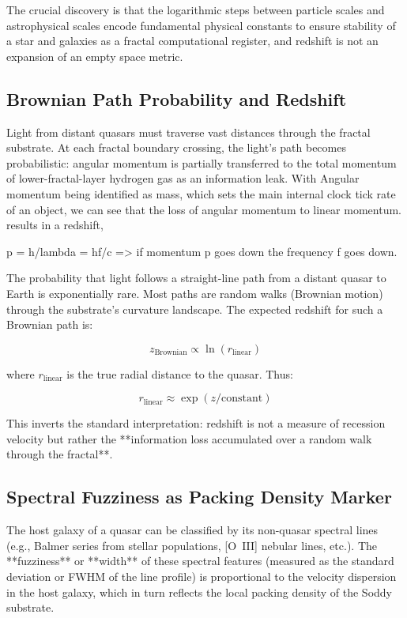\documentclass[11pt,a4paper]{article}
\begin{document}
    The crucial discovery is that the logarithmic steps between particle scales and astrophysical scales encode fundamental physical constants to ensure stability of a star and galaxies as a fractal computational register, and redshift is not an expansion of an empty space metric.

  \subsection{Brownian Path Probability and Redshift}

    Light from distant quasars must traverse vast distances through the fractal substrate. At each fractal boundary crossing, the light's path becomes probabilistic: angular momentum is partially transferred to the total momentum of lower-fractal-layer hydrogen gas as an information leak. With Angular momentum being identified as mass, which sets the main internal clock tick rate of an object, we can see that the loss of angular momentum to linear momentum. results in a redshift,

    p = h/lambda = hf/c => if momentum p goes down the frequency f goes down.  

    The probability that light follows a straight-line path from a distant quasar to Earth is exponentially rare. Most paths are random walks (Brownian motion) through the substrate's curvature landscape. The expected redshift for such a Brownian path is:

    \[
    z_{\text{Brownian}} \propto \ln(r_{\text{linear}})
    \]

    where $r_{\text{linear}}$ is the true radial distance to the quasar. Thus:

    \[
    \boxed{r_{\text{linear}} \approx \exp(z / \text{constant})}
    \]

    This inverts the standard interpretation: redshift is not a measure of recession velocity but rather the **information loss accumulated over a random walk through the fractal**.

  \subsection{Spectral Fuzziness as Packing Density Marker}

    The host galaxy of a quasar can be classified by its non-quasar spectral lines (e.g., Balmer series from stellar populations, [O~III] nebular lines, etc.). The **fuzziness** or **width** of these spectral features (measured as the standard deviation or FWHM of the line profile) is proportional to the velocity dispersion in the host galaxy, which in turn reflects the local packing density of the Soddy substrate.
\end{document}
